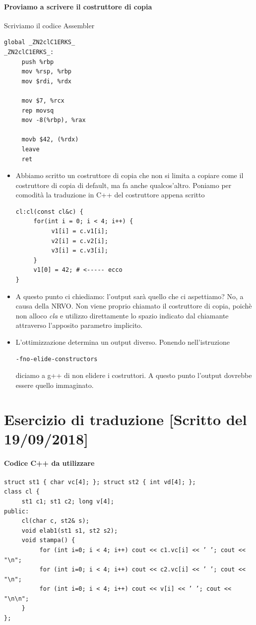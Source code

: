 \documentclass[11pt]{report}
\theoremstyle{definition}
\begin{document}
\paragraph{Proviamo a scrivere il costruttore di copia} Scriviamo il codice Assembler
\begin{verbatim}
global _ZN2clC1ERKS_
_ZN2clC1ERKS_:
     push %rbp
     mov %rsp, %rbp
     mov $rdi, %rdx
     
     mov $7, %rcx
     rep movsq
     mov -8(%rbp), %rax
     
     movb $42, (%rdx)
     leave
     ret
\end{verbatim}
\begin{itemize}
\item Abbiamo scritto un costruttore di copia che non si limita a copiare come il costruttore di copia di default, ma fa anche qualcos'altro. Poniamo per comodità la traduzione in C++ del costruttore appena scritto
\begin{verbatim}
cl:cl(const cl&c) {
     for(int i = 0; i < 4; i++) {
          v1[i] = c.v1[i];
          v2[i] = c.v2[i];
          v3[i] = c.v3[i];
     }
     v1[0] = 42; # <----- ecco
}
\end{verbatim}
\item A questo punto ci chiediamo: l'output sarà quello che ci aspettiamo? No, a causa della NRVO. Non viene proprio chiamato il costruttore di copia, poichè non alloco \emph{cla} e utilizzo direttamente lo spazio indicato dal chiamante attraverso l'apposito parametro implicito. 
\item L'ottimizzazione determina un output diverso. Ponendo nell'istruzione
\begin{verbatim}
-fno-elide-constructors
\end{verbatim}
diciamo a g++ di non elidere i costruttori. A questo punto l'output dovrebbe essere quello immaginato.
\end{itemize}
\endgroup

\section{Esercizio di traduzione [Scritto del 19/09/2018]}
\begingroup
\small
\paragraph{Codice C++ da utilizzare}
\begin{verbatim}
struct st1 { char vc[4]; }; struct st2 { int vd[4]; };
class cl {
     st1 c1; st1 c2; long v[4];
public:
     cl(char c, st2& s);
     void elab1(st1 s1, st2 s2);
     void stampa() {
          for (int i=0; i < 4; i++) cout << c1.vc[i] << ’ ’; cout << "\n";
          for (int i=0; i < 4; i++) cout << c2.vc[i] << ’ ’; cout << "\n";
          for (int i=0; i < 4; i++) cout << v[i] << ’ ’; cout << "\n\n";
     }
};
\end{verbatim}
\end{document}
